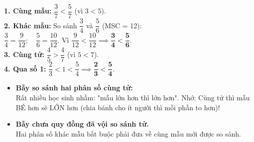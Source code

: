 \documentclass[14pt,a4paper,oneside]{extbook}
\begin{document}
\vspace{-2.5mm}
\noindent
\begin{minipage}[t]{0.49\textwidth}\vspace{0pt}
\begin{tcolorbox}[
  enhanced,
  colback=green!4!white,
  colframe=green!60!black,
  arc=2mm, boxrule=0.8pt,
  left=2mm, right=2mm, top=1.8mm, bottom=1.8mm,
  title={\footnotesize\bfseries\color{white}\faCheckCircle\ Ví dụ thực hành chuẩn mực}
]
{\footnotesize
\textbf{1. Cùng mẫu:} $\dfrac{3}{7} < \dfrac{5}{7}$ (vì $3 < 5$).\\
\textbf{2. Khác mẫu:} So sánh $\dfrac{3}{4}$ và $\dfrac{5}{6}$ (MSC = 12):\\
$\dfrac{3}{4} = \dfrac{9}{12}; \quad \dfrac{5}{6} = \dfrac{10}{12}$. Vì $\dfrac{9}{12} < \dfrac{10}{12} \implies \mathbf{\dfrac{3}{4} < \dfrac{5}{6}}$.\\
\textbf{3. Cùng tử:} $\dfrac{4}{5} > \dfrac{4}{7}$ (vì $5 < 7$).\\
\textbf{4. Qua số 1:} $\dfrac{2}{3} < 1 < \dfrac{5}{4} \implies \mathbf{\dfrac{2}{3} < \dfrac{5}{4}}$.
}
\end{tcolorbox}
\end{minipage}
\hfill
\begin{minipage}[t]{0.49\textwidth}\vspace{0pt}
\begin{tcolorbox}[
  enhanced,
  colback=red!4!white,
  colframe=red!70!black,
  arc=2mm, boxrule=0.8pt,
  left=2mm, right=2mm, top=1.8mm, bottom=1.8mm,
  title={\footnotesize\bfseries\color{white}\faExclamationTriangle\ Mẹo tránh bẫy trắc nghiệm}
]
{\footnotesize
\begin{itemize}\setlength{\itemsep}{1.5pt}\setlength{\leftskip}{-2.5mm}
  \item \textbf{Bẫy so sánh hai phân số cùng tử:}\\
  Rất nhiều học sinh nhầm: "mẫu lớn hơn thì lớn hơn". Nhớ: Cùng tử thì mẫu BÉ hơn sẽ LỚN hơn (chia bánh cho ít người thì mỗi phần to hơn)!
  \item \textbf{Bẫy chưa quy đồng đã vội so sánh tử.}\\
  Hai phân số khác mẫu bắt buộc phải đưa về cùng mẫu mới được so sánh.
\end{itemize}
}
\end{tcolorbox}
\end{minipage}
\end{document}
